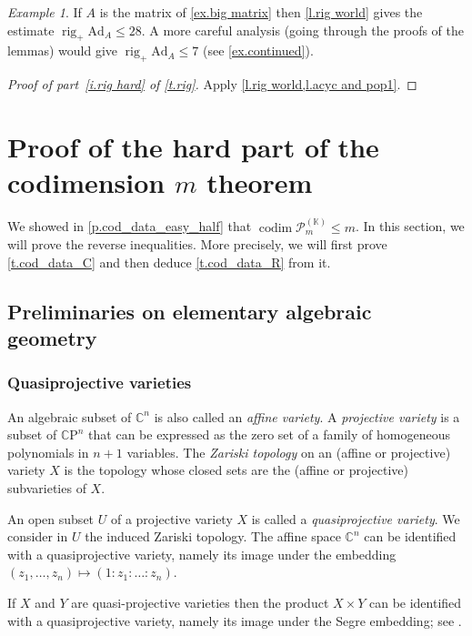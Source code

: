 \documentclass[10pt, a4paper]{amsart}
\theoremstyle{plain}
\theoremstyle{definition}
\theoremstyle{remark}
\theoremstyle{note}
\newtheorem{example}[lemma]{Example}
\numberwithin{equation}{section}
\begin{document}
\begin{example}
If $A$ is the matrix of \cref{ex.big matrix} then \cref{l.rig world}
gives the estimate $\operatorname{rig}_+ {\mathrm{Ad}}_A \le 28$.
A more careful analysis (going through the proofs of the lemmas) would give $\operatorname{rig}_+ {\mathrm{Ad}}_A \le 7$
(see \cref{ex.continued}).
\end{example}

\begin{proof}[Proof of part~\ref{i.rig hard} of \cref{t.rig}]
Apply \cref{l.rig world,l.acyc and pop1}.
\end{proof}

\section{Proof of the hard part of the codimension $m$ theorem}\label{s.cod proof}

We showed in \cref{p.cod_data_easy_half} that $\operatorname{codim} {\mathcal{P}}_m^{({\mathbb{K}})} \le m$.
In this section, we will prove the reverse inequalities.
More precisely, we will first prove \cref{t.cod_data_C}
and then deduce \cref{t.cod_data_R} from it.

\subsection{Preliminaries on elementary algebraic geometry}

\subsubsection{Quasiprojective varieties} 

An algebraic subset of ${\mathbb{C}}^n$ is also called an \emph{affine variety}.
A \emph{projective variety} is a subset of ${\mathbb{C}\mathrm{P}}^n$ that can be expressed 
as the zero set of a family of homogeneous polynomials in $n+1$ variables.
The \emph{Zariski topology} on an (affine or projective) variety $X$ is 
the topology whose closed sets are the (affine or projective) subvarieties of $X$.

An open subset $U$ of a projective variety $X$ is called a \emph{quasiprojective variety}.
We consider in $U$ the induced Zariski topology.
The affine space ${\mathbb{C}}^n$ can be identified with a quasiprojective variety,
namely its image under the embedding $(z_1, \dots, z_n) \mapsto (1: z_1 : \dots : z_n)$.

If $X$ and $Y$ are quasi-projective varieties
then the product $X \times Y$ can be identified with a quasiprojective variety, 
namely its image under the Segre embedding; see \cite[\S~5.1]{Shafa}.
\end{document}
